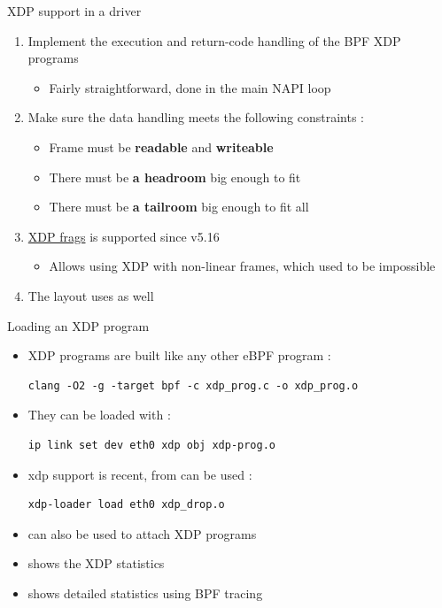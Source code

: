 \begin{frame}{XDP support in a driver}
	\begin{enumerate}
		\item Implement the execution and return-code handling of the BPF XDP programs
			\begin{itemize}
				\item Fairly straightforward, done in the main NAPI loop
			\end{itemize}
		\item Make sure the data handling meets the following constraints :
			\begin{itemize}
				\item Frame must be \textbf{readable} and \textbf{writeable}
				\item There must be \textbf{a headroom} big enough to fit 
				\item There must be \textbf{a tailroom} big enough to fit all 
			\end{itemize}
		\item \href{https://lore.kernel.org/netdev/cover.1642758637.git.lorenzo@kernel.org/}{XDP frags} is supported since v5.16
			\begin{itemize}
				\item Allows using XDP with non-linear frames, which used to be impossible
			\end{itemize}
		\item The  layout uses  as well
	\end{enumerate}
\end{frame}

\begin{frame}[fragile]{Loading an XDP program}
	\begin{itemize}
		\item XDP programs are built like any other eBPF program :
			\begin{verbatim}
clang -O2 -g -target bpf -c xdp_prog.c -o xdp_prog.o
			\end{verbatim}
		\item They can be loaded with  :
			\begin{verbatim}
ip link set dev eth0 xdp obj xdp-prog.o
			\end{verbatim}
		\item {} xdp support is recent,  from  can be used :
			\begin{verbatim}
xdp-loader load eth0 xdp_drop.o
			\end{verbatim}
		\item {} can also be used to attach XDP programs
		\item {} shows the XDP statistics
		\item {} shows detailed statistics using BPF tracing

	\end{itemize}
\end{frame}



